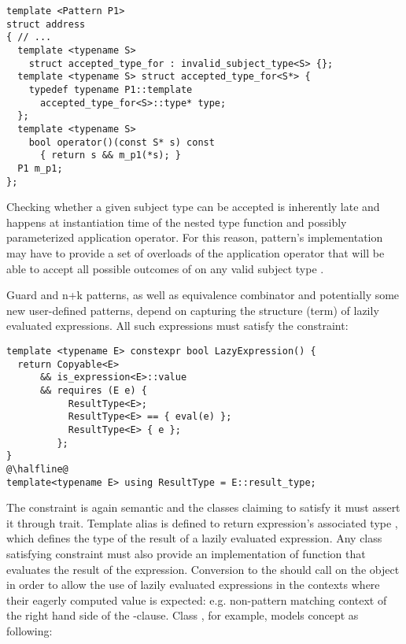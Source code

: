 \begin{lstlisting}
template <Pattern P1>
struct address
{ // ...
  template <typename S> 
    struct accepted_type_for : invalid_subject_type<S> {};
  template <typename S> struct accepted_type_for<S*> {
    typedef typename P1::template 
      accepted_type_for<S>::type* type;
  };
  template <typename S>
    bool operator()(const S* s) const 
      { return s && m_p1(*s); }
  P1 m_p1;
};
\end{lstlisting}

\noindent
Checking whether a given subject type can be accepted is inherently late and 
happens at instantiation time of the nested  type 
function and possibly parameterized application operator. For this reason, 
pattern's implementation may have to provide a set of overloads of the 
application operator that will be able to accept all possible outcomes of 
 on any valid subject type .

Guard and n+k patterns, as well as equivalence combinator and potentially some 
new user-defined patterns, depend on capturing the structure (term) of lazily 
evaluated expressions. All such expressions must satisfy the 
 constraint:

\begin{lstlisting}
template <typename E> constexpr bool LazyExpression() {
  return Copyable<E> 
      && is_expression<E>::value
      && requires (E e) {
           ResultType<E>;
           ResultType<E> == { eval(e) };
           ResultType<E> { e };
         };
}
@\halfline@
template<typename E> using ResultType = E::result_type;
\end{lstlisting}

\noindent
The constraint is again semantic and the classes claiming to satisfy it must 
assert it through  trait. Template alias  
is defined to return expression's associated type , which 
defines the type of the result of a lazily evaluated expression. Any class 
satisfying  constraint must also provide an implementation 
of function  that evaluates the result of the expression. Conversion 
to the  should call  on the object in order to 
allow the use of lazily evaluated expressions in the contexts where their 
eagerly computed value is expected: e.g. non-pattern matching context of the 
right hand side of the -clause. Class , for example, 
models concept  as following:

